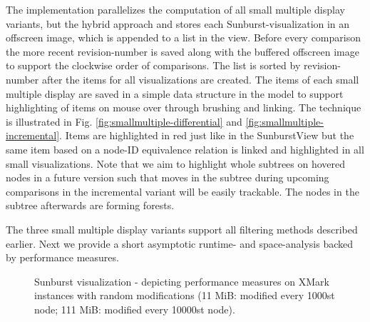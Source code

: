 The implementation parallelizes the computation of all small multiple display variants, but the hybrid approach and stores each Sunburst-visualization in an offscreen image, which is appended to a list in the view. Before every comparison the more recent revision-number is saved along with the buffered offscreen image to support the clockwise order of comparisons. The list is sorted by revision-number after the items for all visualizations are created. The items of each small multiple display are saved in a simple data structure in the model to support highlighting of items on mouse over through brushing and linking. The technique is illustrated in Fig. \ref{fig:smallmultiple-differential} and \ref{fig:smallmultiple-incremental}. Items are highlighted in red just like in the SunburstView but the same item based on a node-ID equivalence relation is linked and highlighted in all small visualizations. Note that we aim to highlight whole subtrees on hovered nodes in a future version such that moves in the subtree during upcoming comparisons in the incremental variant will be easily trackable. The nodes in the subtree afterwards are forming forests. 

The three small multiple display variants support all filtering methods described earlier. Next we provide a short asymptotic runtime- and space-analysis backed by performance measures.

\begin{figure}[tb]
\caption{\label{fig:gui-performance} Sunburst visualization - depicting performance measures on XMark instances with random modifications (11 MiB: modified every 1000st node; 111 MiB: modified every 10000st node).}
\end{figure}

